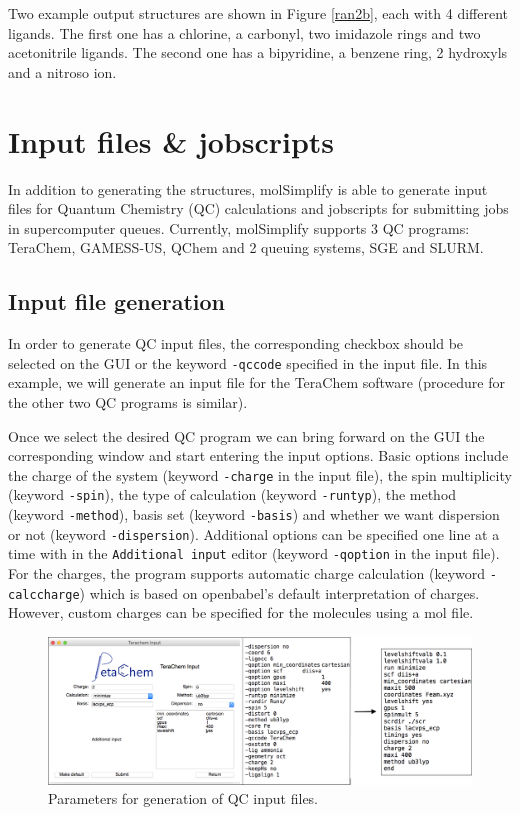 \documentclass[a4paper,12pt]{assignment}
\begin{document}
Two example output structures are shown in Figure \ref{ran2b}, each with 4 different ligands. The first one has a chlorine, a carbonyl, two imidazole rings and two acetonitrile ligands. The second one has a bipyridine, a benzene ring, 2 hydroxyls and a nitroso ion. 


\section{Input files \& jobscripts}
In addition to generating the structures, molSimplify is able to generate input files for Quantum Chemistry (QC) calculations and jobscripts for submitting jobs in supercomputer queues. Currently, molSimplify supports 3 QC programs: TeraChem, GAMESS-US, QChem and 2 queuing systems, SGE and SLURM.


\subsection{Input file generation}

In order to generate QC input files, the corresponding checkbox should be selected on the GUI or the keyword \texttt{-qccode} specified in the input file. In this example, we will generate an input file for the TeraChem software (procedure for the other two QC programs is similar).

Once we select the desired QC program we can bring forward on the GUI the corresponding window and start entering the input options. Basic options include the charge of the system (keyword \texttt{-charge} in the input file), the spin multiplicity (keyword \texttt{-spin}), the type of calculation (keyword \texttt{-runtyp}), the method (keyword \texttt{-method}), basis set (keyword \texttt{-basis}) and whether we want dispersion or not (keyword \texttt{-dispersion}). Additional options can be specified one line at a time with in the \texttt{Additional input} editor (keyword \texttt{-qoption} in the input file). For the charges, the program supports automatic charge calculation (keyword \texttt{-calccharge}) which is based on openbabel's default interpretation of charges. However, custom charges can be specified for the molecules using a mol file.

\begin{figure}[htb!]
\centering
\includegraphics[width=\textwidth]{./Figures/fig10.png}
\caption{Parameters for generation of QC input files.}
\label{inp1}
\end{figure}
\end{document}

